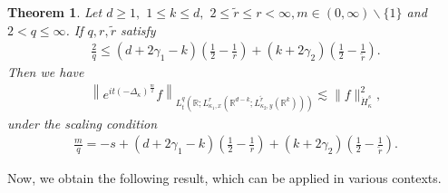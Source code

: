 \documentclass[a4paper,11pt, reqno]{amsart}
\newtheorem{theorem}{Theorem}[section]
\theoremstyle{definition}
\theoremstyle{remark}
\numberwithin{equation}{section}
\newcommand{\K}{\kappa }
\begin{document}
	\begin{theorem}\label{D Main Dunkl}
		Let $d\geq 1,$ $1 \leq k \leq d,$ $  2 \leq \widetilde{r} \leq r<\infty ,m\in (0, \infty)\backslash \{1\}$ and $ 2<q \leq \infty$. If $ q, r, \tilde{r}$ satisfy
		\begin{align}\label{Deq0}
			\frac{2}{q} \leq(d+2\gamma_1-k)\left(\frac{1}{2}-\frac{1}{r}\right)+(k+2\gamma_2)\left(\frac{1}{2}-\frac{1}{\widetilde{r}}\right). 
		\end{align}
		Then we have
		\begin{align}\label{Deq1}
			\left\|e^{i t(-\Delta_\kappa)^{\frac{m}{2}}} f\right\|_{L_t^q\left(\mathbb{R} ; L_{{\K_1,x}}^r\left(\mathbb{R}^{d-k} ; L_{{\K_2,y}}^{\tilde{r}}\left(\mathbb{R}^k\right)\right)\right)} \lesssim\|f\|_{\dot{H}_{\kappa}^s}^2,
		\end{align}
		under the scaling condition
		\begin{align}\label{Deq2}
			\frac{{{m}}}{q}=-s +(d+2\gamma_1-k)\left(\frac{1}{2}-\frac{1}{r}\right)+(k+2\gamma_2)\left(\frac{1}{2}-\frac{1}{\widetilde{r}}\right).
		\end{align}
	\end{theorem}   
    
    
    Now, we obtain the following result, which can be applied in various contexts. 
    
    
	
\end{document}
